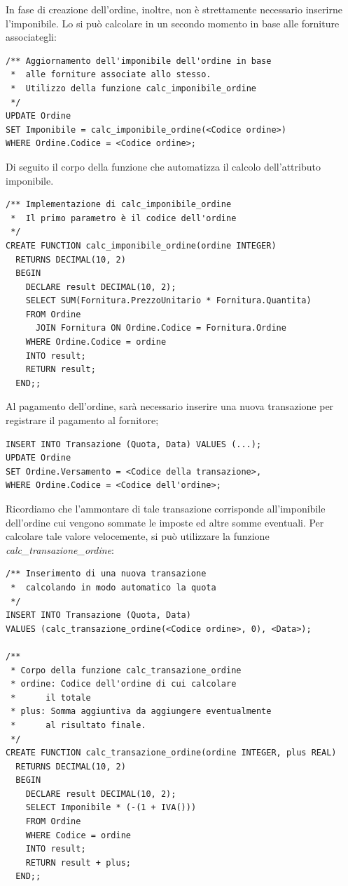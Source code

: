 				In fase di creazione dell'ordine, inoltre, non è strettamente necessario inserirne l'imponibile. Lo si può calcolare in un secondo momento in base alle forniture associategli:

				\begin{lstlisting}
/** Aggiornamento dell'imponibile dell'ordine in base
 *  alle forniture associate allo stesso.
 *  Utilizzo della funzione calc_imponibile_ordine
 */
UPDATE Ordine
SET Imponibile = calc_imponibile_ordine(<Codice ordine>)
WHERE Ordine.Codice = <Codice ordine>;
				\end{lstlisting}

				Di seguito il corpo della funzione che automatizza il calcolo dell'attributo imponibile.

				\begin{lstlisting}
/** Implementazione di calc_imponibile_ordine
 *  Il primo parametro è il codice dell'ordine 
 */
CREATE FUNCTION calc_imponibile_ordine(ordine INTEGER)
  RETURNS DECIMAL(10, 2)
  BEGIN
    DECLARE result DECIMAL(10, 2);
    SELECT SUM(Fornitura.PrezzoUnitario * Fornitura.Quantita)
    FROM Ordine
      JOIN Fornitura ON Ordine.Codice = Fornitura.Ordine
    WHERE Ordine.Codice = ordine
    INTO result;
    RETURN result;
  END;;
				\end{lstlisting}

				Al pagamento dell'ordine, sarà necessario inserire una nuova transazione per registrare il pagamento al fornitore;

				\begin{lstlisting}
INSERT INTO Transazione (Quota, Data) VALUES (...);
UPDATE Ordine
SET Ordine.Versamento = <Codice della transazione>,
WHERE Ordine.Codice = <Codice dell'ordine>;
				\end{lstlisting}

				Ricordiamo che l'ammontare di tale transazione corrisponde all'imponibile dell'ordine cui vengono sommate le imposte ed altre somme eventuali. Per calcolare tale valore velocemente, si può utilizzare la funzione \emph{calc\_transazione\_ordine}:

				\begin{lstlisting}
/** Inserimento di una nuova transazione
 *  calcolando in modo automatico la quota 
 */
INSERT INTO Transazione (Quota, Data)
VALUES (calc_transazione_ordine(<Codice ordine>, 0), <Data>);

/**
 * Corpo della funzione calc_transazione_ordine
 * ordine: Codice dell'ordine di cui calcolare
 * 		il totale
 * plus: Somma aggiuntiva da aggiungere eventualmente
 * 		al risultato finale.
 */
CREATE FUNCTION calc_transazione_ordine(ordine INTEGER, plus REAL)
  RETURNS DECIMAL(10, 2)
  BEGIN
    DECLARE result DECIMAL(10, 2);
    SELECT Imponibile * (-(1 + IVA()))
    FROM Ordine
    WHERE Codice = ordine
    INTO result;
    RETURN result + plus;
  END;;
				\end{lstlisting}

